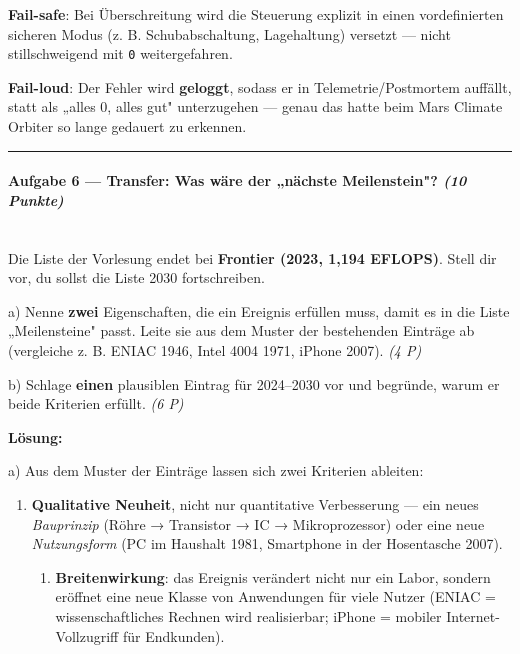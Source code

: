 \documentclass[11pt, a4paper]{article}
\begin{document}
\textbf{Fail-safe}: Bei Überschreitung wird die Steuerung explizit in einen vordefinierten sicheren Modus (z. B. Schubabschaltung, Lagehaltung) versetzt — nicht stillschweigend mit \texttt{0} weitergefahren.

\textbf{Fail-loud}: Der Fehler wird \textbf{geloggt}, sodass er in Telemetrie/Postmortem auffällt, statt als „alles 0, alles gut" unterzugehen — genau das hatte beim Mars Climate Orbiter so lange gedauert zu erkennen.



\noindent\textcolor{rulegray}{\rule{\linewidth}{0.4pt}}


\paragraph{Aufgabe 6 — Transfer: Was wäre der „nächste Meilenstein"? \textit{(10 Punkte)}}\mbox{}\\[2pt]

Die Liste der Vorlesung endet bei \textbf{Frontier (2023, 1,194 EFLOPS)}. Stell dir vor, du sollst die Liste 2030 fortschreiben.


a) Nenne \textbf{zwei} Eigenschaften, die ein Ereignis erfüllen muss, damit es in die Liste „Meilensteine" passt. Leite sie aus dem Muster der bestehenden Einträge ab (vergleiche z. B. ENIAC 1946, Intel 4004 1971, iPhone 2007). \textit{(4 P)}


b) Schlage \textbf{einen} plausiblen Eintrag für 2024–2030 vor und begründe, warum er beide Kriterien erfüllt. \textit{(6 P)}


\textbf{Lösung:}


a) Aus dem Muster der Einträge lassen sich zwei Kriterien ableiten:

\begin{enumerate}
  \item \textbf{Qualitative Neuheit}, nicht nur quantitative Verbesserung — ein neues \textit{Bauprinzip} (Röhre → Transistor → IC → Mikroprozessor) oder eine neue \textit{Nutzungsform} (PC im Haushalt 1981, Smartphone in der Hosentasche 2007).
\begin{enumerate}
  \item \textbf{Breitenwirkung}: das Ereignis verändert nicht nur ein Labor, sondern eröffnet eine neue Klasse von Anwendungen für viele Nutzer (ENIAC = wissenschaftliches Rechnen wird realisierbar; iPhone = mobiler Internet-Vollzugriff für Endkunden).
\end{enumerate}
\end{enumerate}
\end{document}
